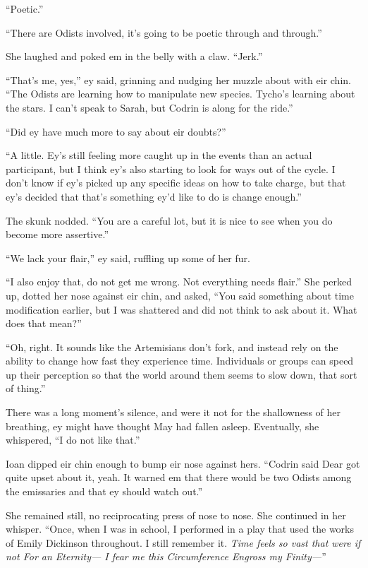 ``Poetic.''

``There are Odists involved, it's going to be poetic through and through.''

She laughed and poked em in the belly with a claw. ``Jerk.''

``That's me, yes,'' ey said, grinning and nudging her muzzle about with eir chin. ``The Odists are learning how to manipulate new species. Tycho's learning about the stars. I can't speak to Sarah, but Codrin is along for the ride.''

``Did ey have much more to say about eir doubts?''

``A little. Ey's still feeling more caught up in the events than an actual participant, but I think ey's also starting to look for ways out of the cycle. I don't know if ey's picked up any specific ideas on how to take charge, but that ey's decided that that's something ey'd like to do is change enough.''

The skunk nodded. ``You are a careful lot, but it is nice to see when you do become more assertive.''

``We lack your flair,'' ey said, ruffling up some of her fur.

``I also enjoy that, do not get me wrong. Not everything needs flair.'' She perked up, dotted her nose against eir chin, and asked, ``You said something about time modification earlier, but I was shattered and did not think to ask about it. What does that mean?''

``Oh, right. It sounds like the Artemisians don't fork, and instead rely on the ability to change how fast they experience time. Individuals or groups can speed up their perception so that the world around them seems to slow down, that sort of thing.''

There was a long moment's silence, and were it not for the shallowness of her breathing, ey might have thought May had fallen asleep. Eventually, she whispered, ``I do not like that.''

Ioan dipped eir chin enough to bump eir nose against hers. ``Codrin said Dear got quite upset about it, yeah. It warned em that there would be two Odists among the emissaries and that ey should watch out.''

She remained still, no reciprocating press of nose to nose. She continued in her whisper. ``Once, when I was in school, I performed in a play that used the works of Emily Dickinson throughout. I still remember it. \emph{Time feels so vast that were if not For an Eternity— I fear me this Circumference Engross my Finity—}''

